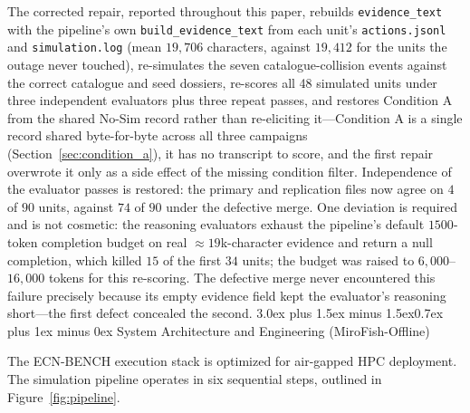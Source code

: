 \documentclass[11pt,journal,onecolumn]{IEEEtran}
\makeatletter
\renewcommand\section{\@startsection{section}{1}{\z@}%
  {3.0ex plus 1.5ex minus 1.5ex}{0.7ex plus 1ex minus 0ex}%
  {\normalfont\normalsize\centering\bfseries}}
\makeatother
\begin{document}
The corrected repair, reported throughout this paper, rebuilds \texttt{evidence\_text} with the pipeline's own \texttt{build\_evidence\_text} from each unit's \texttt{actions.jsonl} and \texttt{simulation.log} (mean $19{,}706$ characters, against $19{,}412$ for the units the outage never touched), re-simulates the seven catalogue-collision events against the correct catalogue and seed dossiers, re-scores all 48 simulated units under three independent evaluators plus three repeat passes, and restores Condition A from the shared No-Sim record rather than re-eliciting it---Condition A is a single record shared byte-for-byte across all three campaigns (Section~\ref{sec:condition_a}), it has no transcript to score, and the first repair overwrote it only as a side effect of the missing condition filter. Independence of the evaluator passes is restored: the primary and replication files now agree on $4$ of $90$ units, against $74$ of $90$ under the defective merge. One deviation is required and is not cosmetic: the reasoning evaluators exhaust the pipeline's default $1500$-token completion budget on real $\approx19$k-character evidence and return a null completion, which killed $15$ of the first $34$ units; the budget was raised to $6{,}000$--$16{,}000$ tokens for this re-scoring. The defective merge never encountered this failure precisely because its empty evidence field kept the evaluator's reasoning short---the first defect concealed the second.
\section{System Architecture and Engineering (MiroFish-Offline)}
\label{sec:architecture}

The ECN-BENCH execution stack is optimized for air-gapped HPC deployment. The simulation pipeline operates in six sequential steps, outlined in Figure~\ref{fig:pipeline}.
\end{document}
